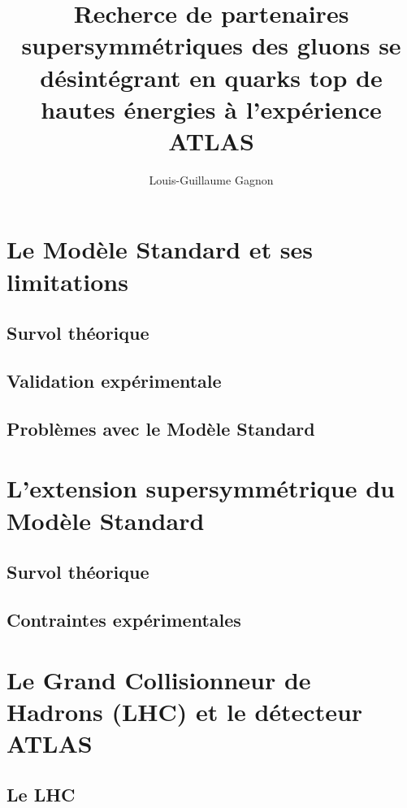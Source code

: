 \documentclass[12pt,canadien]{report}
\title{Recherce de partenaires supersymmétriques des gluons se
  désintégrant en quarks top de hautes énergies à l'expérience ATLAS}
\author{Louis-Guillaume Gagnon}
\begin{document}
\maketitle{}
\doublespacing

\tableofcontents{}

\chapter{Le Modèle Standard et ses limitations}
\label{sec:ms}

\section{Survol théorique}
\label{sec:ms:th}

\section{Validation expérimentale}
\label{sec:ms:exp}

\section{Problèmes avec le Modèle Standard}
\label{sec:ms:problemes}

\singlespacing{}
\chapter{L'extension supersymmétrique du Modèle Standard}
\label{sec:susy}
\doublespacing{}

\section{Survol théorique}
\label{sec:susy:th}

\section{Contraintes expérimentales}
\label{sec:susy:contraintes}

\singlespacing{}
\chapter{Le Grand Collisionneur de Hadrons (LHC) et le détecteur
  ATLAS}
\label{sec:lhc_atlas}
\doublespacing{}

\section{Le LHC}
\label{sec:lhc_atlas:lhc}
\end{document}
